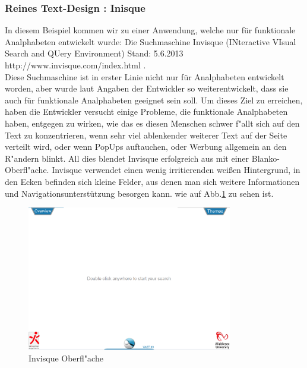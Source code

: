 \newpage
\subsubsection{Reines Text-Design : Inisque}
In diesem Beispiel kommen wir zu einer Anwendung, welche nur für funktionale Analphabeten entwickelt wurde: Die Suchmaschine Invisque (INteractive VIsual Search and QUery Environment)
						{Stand: 5.6.2013}
						{http://www.invisque.com/index.html}{}
.\\ Diese Suchmaschine ist in erster Linie nicht nur für Analphabeten entwickelt worden, aber wurde laut Angaben der Entwickler so weiterentwickelt, dass sie auch für funktionale Analphabeten geeignet sein soll. Um dieses Ziel zu erreichen, haben die Entwickler versucht einige Probleme, die funktionale Analphabeten haben, entgegen zu wirken, wie das es diesen Menschen schwer f"allt sich auf den Text zu konzentrieren, wenn sehr viel ablenkender weiterer Text auf der Seite verteilt wird, oder wenn PopUps auftauchen, oder Werbung allgemein an den R"andern blinkt. All dies blendet Invisque erfolgreich aus mit einer Blanko-Oberfl"ache. Invisque verwendet einen wenig irritierenden weißen Hintergrund, in den Ecken befinden sich kleine Felder, aus denen man sich weitere Informationen und Navigationsunterstützung besorgen kann. wie auf Abb.\ref{fig:Invisque} zu sehen ist.

\begin{figure}[h]
	\centering
		\includegraphics[width=0.80\textwidth]{Daten/Inisque.PNG}
	\caption{Invisque Oberfl"ache}
	\label{fig:Invisque}
\end{figure}


